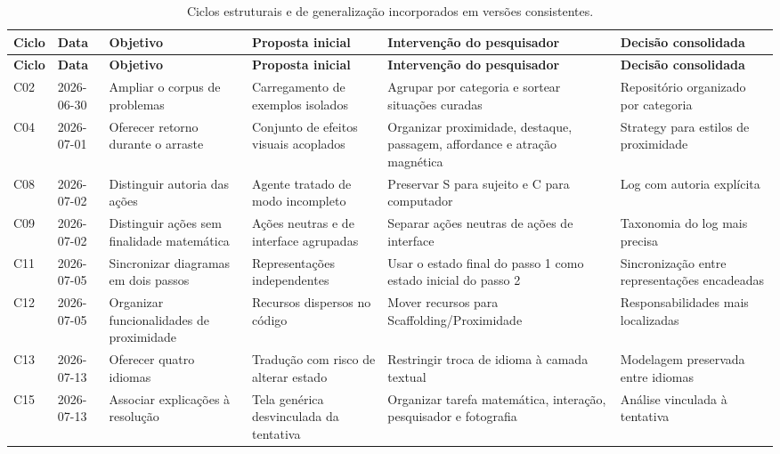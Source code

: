 \begin{landscape}
\begingroup
\setlength{\tabcolsep}{3pt}
\small
\begin{longtable}{p{1.0cm}p{1.9cm}p{4.0cm}p{5.0cm}p{6.2cm}p{5.7cm}}
\caption{Ciclos estruturais e de generalização incorporados em versões consistentes.}\\
\toprule
\textbf{Ciclo} & \textbf{Data} & \textbf{Objetivo} & \textbf{Proposta inicial} & \textbf{Intervenção do pesquisador} & \textbf{Decisão consolidada} \\
\midrule
\endfirsthead
\toprule
\textbf{Ciclo} & \textbf{Data} & \textbf{Objetivo} & \textbf{Proposta inicial} & \textbf{Intervenção do pesquisador} & \textbf{Decisão consolidada} \\
\midrule
\endhead
C02 & 2026-06-30 & Ampliar o corpus de problemas & Carregamento de exemplos isolados & Agrupar por categoria e sortear situações curadas & Repositório organizado por categoria \\
\addlinespace[2pt]
C04 & 2026-07-01 & Oferecer retorno durante o arraste & Conjunto de efeitos visuais acoplados & Organizar proximidade, destaque, passagem, affordance e atração magnética & Strategy para estilos de proximidade \\
\addlinespace[2pt]
C08 & 2026-07-02 & Distinguir autoria das ações & Agente tratado de modo incompleto & Preservar S para sujeito e C para computador & Log com autoria explícita \\
\addlinespace[2pt]
C09 & 2026-07-02 & Distinguir ações sem finalidade matemática & Ações neutras e de interface agrupadas & Separar ações neutras de ações de interface & Taxonomia do log mais precisa \\
\addlinespace[2pt]
C11 & 2026-07-05 & Sincronizar diagramas em dois passos & Representações independentes & Usar o estado final do passo 1 como estado inicial do passo 2 & Sincronização entre representações encadeadas \\
\addlinespace[2pt]
C12 & 2026-07-05 & Organizar funcionalidades de proximidade & Recursos dispersos no código & Mover recursos para Scaffolding/Proximidade & Responsabilidades mais localizadas \\
\addlinespace[2pt]
C13 & 2026-07-13 & Oferecer quatro idiomas & Tradução com risco de alterar estado & Restringir troca de idioma à camada textual & Modelagem preservada entre idiomas \\
\addlinespace[2pt]
C15 & 2026-07-13 & Associar explicações à resolução & Tela genérica desvinculada da tentativa & Organizar tarefa matemática, interação, pesquisador e fotografia & Análise vinculada à tentativa \\

\end{longtable}
\end{landscape}
